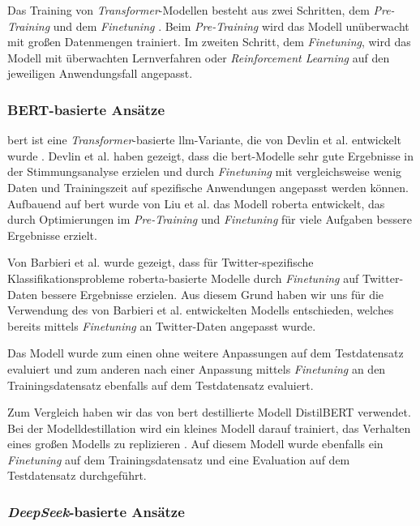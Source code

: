 Das Training von \textit{Transformer}-Modellen besteht aus zwei Schritten, dem \textit{Pre-Training} und dem \textit{Finetuning} \cite{Radford2018ImprovingLU}.
Beim \textit{Pre-Training} wird das Modell unüberwacht mit großen Datenmengen trainiert.
Im zweiten Schritt, dem \textit{Finetuning}, wird das Modell mit überwachten Lernverfahren oder \textit{Reinforcement Learning} \cite{deepseekai2025deepseekr1incentivizingreasoningcapability, devlin2018bert} auf den jeweiligen Anwendungsfall angepasst.


\subsubsection{BERT-basierte Ansätze}\label{subsec:bert}

\gls{bert} ist eine \textit{Transformer}-basierte \gls{llm}-Variante, die von Devlin et al. entwickelt wurde \cite{devlin2018bert}.
Devlin et al. haben gezeigt, dass die \gls{bert}-Modelle sehr gute Ergebnisse in der Stimmungsanalyse erzielen und durch \textit{Finetuning} mit vergleichsweise wenig Daten und Trainingszeit auf spezifische Anwendungen angepasst werden können.
Aufbauend auf \gls{bert} wurde von Liu et al. \cite{liu2019roberta} das Modell \gls{roberta} entwickelt, das durch Optimierungen im \textit{Pre-Training} und \textit{Finetuning} für viele Aufgaben bessere Ergebnisse erzielt.

Von Barbieri et al. \cite{barbieri2020tweeteval} wurde gezeigt, dass für Twitter-spezifische Klassifikationsprobleme \gls{roberta}-basierte Modelle durch \textit{Finetuning} auf Twitter-Daten bessere Ergebnisse erzielen.
Aus diesem Grund haben wir uns für die Verwendung des von Barbieri et al. entwickelten Modells entschieden, welches bereits mittels \textit{Finetuning} an Twitter-Daten angepasst wurde.

Das Modell wurde zum einen ohne weitere Anpassungen auf dem Testdatensatz evaluiert und zum anderen nach einer Anpassung mittels \textit{Finetuning} an den Trainingsdatensatz ebenfalls auf dem Testdatensatz evaluiert.

Zum Vergleich haben wir das von \gls{bert} destillierte Modell DistilBERT \cite{sanh2019distilbert} verwendet.
Bei der Modelldestillation wird ein kleines Modell darauf trainiert, das Verhalten eines großen Modells zu replizieren \cite{sanh2019distilbert}.
Auf diesem Modell wurde ebenfalls ein \textit{Finetuning} auf dem Trainingsdatensatz und eine Evaluation auf dem Testdatensatz durchgeführt.


\subsubsection{\textit{DeepSeek}-basierte Ansätze}\label{subsec:deepseek}

